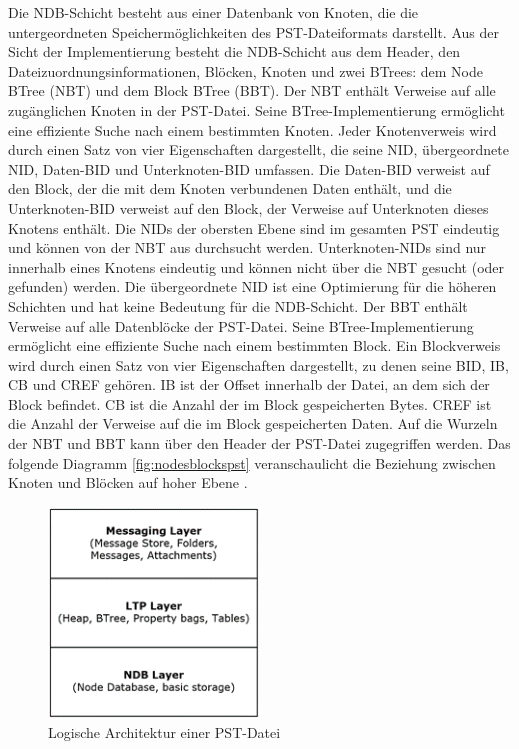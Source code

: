 Die NDB-Schicht besteht aus einer Datenbank von Knoten, die die untergeordneten Speichermöglichkeiten des PST-Dateiformats darstellt. Aus der Sicht der Implementierung besteht die NDB-Schicht aus dem Header, den Dateizuordnungsinformationen, Blöcken, Knoten und zwei BTrees: dem Node BTree (NBT) und dem Block BTree (BBT). Der NBT enthält Verweise auf alle zugänglichen Knoten in der PST-Datei. Seine BTree-Implementierung ermöglicht eine effiziente Suche nach einem bestimmten Knoten. Jeder Knotenverweis wird durch einen Satz von vier Eigenschaften dargestellt, die seine NID, übergeordnete NID, Daten-BID und Unterknoten-BID umfassen. Die Daten-BID verweist auf den Block, der die mit dem Knoten verbundenen Daten enthält, und die Unterknoten-BID verweist auf den Block, der Verweise auf Unterknoten dieses Knotens enthält. Die NIDs der obersten Ebene sind im gesamten PST eindeutig und können von der NBT aus durchsucht werden. Unterknoten-NIDs sind nur innerhalb eines Knotens eindeutig und können nicht über die NBT gesucht (oder gefunden) werden. Die übergeordnete NID ist eine Optimierung für die höheren Schichten und hat keine Bedeutung für die NDB-Schicht. Der BBT enthält Verweise auf alle Datenblöcke der PST-Datei. Seine BTree-Implementierung ermöglicht eine effiziente Suche nach einem bestimmten Block. Ein Blockverweis wird durch einen Satz von vier Eigenschaften dargestellt, zu denen seine BID, IB, CB und CREF gehören. IB ist der Offset innerhalb der Datei, an dem sich der Block befindet. CB ist die Anzahl der im Block gespeicherten Bytes. CREF ist die Anzahl der Verweise auf die im Block gespeicherten Daten. Auf die Wurzeln der NBT und BBT kann über den Header der PST-Datei zugegriffen werden.
Das folgende Diagramm \ref{fig:nodesblockspst} veranschaulicht die Beziehung zwischen Knoten und Blöcken auf hoher Ebene \cite{.c}.

\begin{figure}
    \centering
    \includegraphics[width=0.50\textwidth]{images/PST_File.png}
    \caption{Logische Architektur einer PST-Datei \cite{.c}} 
    \label{fig:pstarchitecture}
\end{figure}

